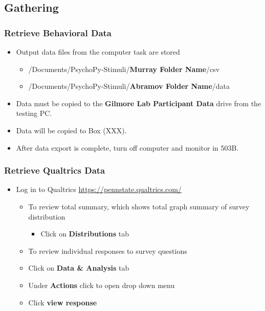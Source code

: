 \documentclass[]{article}
\providecommand{\tightlist}{%
  \setlength{\itemsep}{0pt}\setlength{\parskip}{0pt}}
\begin{document}
\hypertarget{gathering}{%
\subsection{Gathering}\label{gathering}}

\hypertarget{retrieve-behavioral-data}{%
\subsubsection{Retrieve Behavioral
Data}\label{retrieve-behavioral-data}}

\begin{itemize}
\tightlist
\item
  Output data files from the computer task are stored

  \begin{itemize}
  \tightlist
  \item
    /Documents/PsychoPy-Stimuli/\textbf{Murray Folder Name}/csv
  \item
    /Documents/PsychoPy-Stimuli/\textbf{Abramov Folder Name}/data
  \end{itemize}
\item
  Data must be copied to the \textbf{Gilmore Lab Participant Data} drive
  from the testing PC.
\item
  Data will be copied to Box (XXX).
\item
  After data export is complete, turn off computer and monitor in 503B.
\end{itemize}

\hypertarget{retrieve-qualtrics-data}{%
\subsubsection{Retrieve Qualtrics Data}\label{retrieve-qualtrics-data}}

\begin{itemize}
\tightlist
\item
  Log in to Qualtrics \url{https://pennstate.qualtrics.com/}

  \begin{itemize}
  \tightlist
  \item
    To review total summary, which shows total graph summary of survey
    distribution

    \begin{itemize}
    \tightlist
    \item
      Click on \textbf{Distributions} tab
    \end{itemize}
  \item
    To review individual responses to survey questions
  \item
    Click on \textbf{Data \& Analysis} tab
  \item
    Under \textbf{Actions} click to open drop down menu
  \item
    Click \textbf{view response}
  \end{itemize}
\end{itemize}
\end{document}
